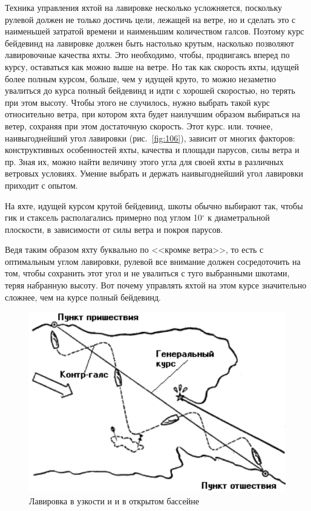 \documentclass[a4paper, 12pt, twoside, final]{scrbook}
\begin{document}
Техника управления яхтой на лавировке несколько усложняется, поскольку рулевой должен не только достичь цели, лежащей на ветре, но и сделать это с наименьшей затратой времени и наименьшим количеством галсов. Поэтому курс бейдевинд на лавировке должен быть настолько крутым, насколько позволяют лавировочные качества яхты. Это необходимо, чтобы, продвигаясь вперед по курсу, оставаться как можно выше на ветре. Но так как скорость яхты, идущей более полным курсом, больше, чем у идущей круто, то можно незаметно увалиться до курса полный бейдевинд и идти с хорошей скоростью, но терять при этом высоту. Чтобы этого не случилось, нужно выбрать такой курс относительно ветра, при котором яхта будет наилучшим образом выбираться на ветер, сохраняя при этом достаточную скорость. Этот курс. или. точнее, наивыгоднейший угол лавировки (рис.~\ref{fig:106}), зависит от многих факторов: конструктивных особенностей яхты, качества и площади парусов, силы ветра и пр. Зная их, можно найти величину этого угла для своей яхты в различных ветровых условиях. Умение выбрать и держать наивыгоднейший угол лавировки приходит с опытом.

На яхте, идущей курсом крутой бейдевинд, шкоты обычно выбирают так, чтобы гик и стаксель располагались примерно под углом 10$^\circ$ к диаметральной плоскости, в зависимости от силы ветра и покроя парусов.

Ведя таким образом яхту буквально по <<кромке ветра>>, то есть с оптимальным углом лавировки, рулевой все внимание должен сосредоточить на том, чтобы сохранить этот угол и не увалиться с туго выбранными шкотами, теряя набранную высоту. Вот почему управлять яхтой на этом курсе значительно сложнее, чем на курсе полный бейдевинд.

\begin{figure}
	\centering
	\includegraphics[scale=0.9]{107_Lavirovka}
	\caption{Лавировка в узкости и и в открытом бассейне}
	\label{fig:107}
\end{figure}
\end{document}
